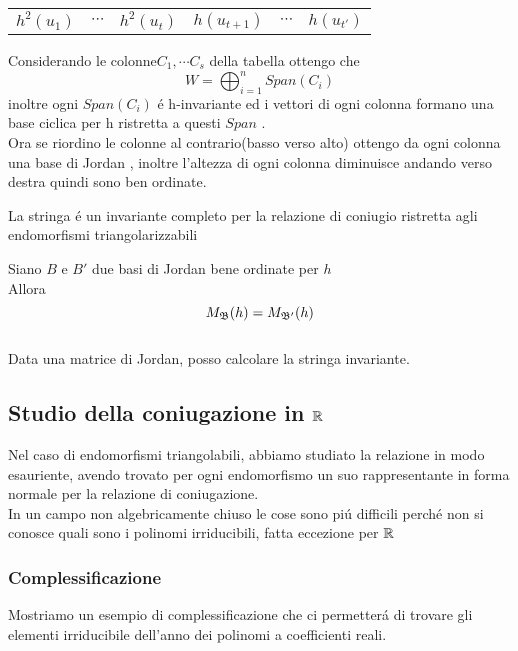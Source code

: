\begin{thm}
\begin{center}
\begin{tabular}{cccccc}
$ h^2(u_1)$ & $\cdots$ & $h^2(u_t)$ & $h(u_{t+1})$ & $\cdots$ & $h(u_{t'})$ \\ 
\end{tabular} 
\end{center}
Considerando le colonne$C_1, \cdots C_s$ della tabella ottengo che
$$ W = \bigoplus_{i=1}^n Span(C_i) $$
inoltre ogni $Span(C_i)$ \'e h-invariante ed i vettori di ogni colonna formano una base ciclica per h ristretta a questi $Span$ .\\
Ora se riordino le colonne al contrario(basso verso alto) ottengo da ogni colonna una base di Jordan , inoltre l'altezza di ogni colonna diminuisce andando verso destra quindi sono ben ordinate.
\endproof
\end{thm}
\begin{cor} La stringa \'e un invariante completo per la relazione di coniugio ristretta agli endomorfismi triangolarizzabili
\end{cor}

\spazio
\begin{thm}[Unicit\'a] \bianco
Siano $B$ e $B'$ due basi di Jordan bene ordinate per $h$ \\
Allora
$$M_{\mathfrak{B}} (h) = M_{\mathfrak{B}'}(h)$$ \\
Data una matrice di Jordan, posso calcolare la stringa invariante.
\end{thm} 
\spazio
\newpage


\subsection{Studio della coniugazione in $\mathbb{R}$}
Nel caso di endomorfismi triangolabili, abbiamo studiato la relazione in modo esauriente, avendo trovato per ogni endomorfismo un suo rappresentante in forma normale per la relazione di coniugazione.\\
In un campo non algebricamente chiuso le cose sono pi\'u difficili perch\'e non si conosce quali sono i polinomi irriducibili, fatta eccezione per $\mathbb{R}$

\subsubsection*{Complessificazione}
Mostriamo un esempio di complessificazione che ci permetter\'a di trovare gli elementi irriducibile dell'anno dei polinomi a coefficienti reali.
